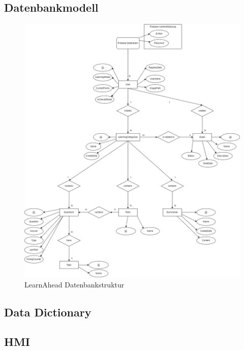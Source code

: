     \subsection{Datenbankmodell}
    \begin{figure}[H]
        \centering
        \includegraphics[width=1\textwidth]{images/LearnAheadDatenbankstruktur.png}
        \caption{LearnAhead Datenbankstruktur}
        \label{fig:LearnAheadDatenbankstruktur}
    \end{figure}\noindent

\subsection{Data Dictionary}

\subsection{HMI}

